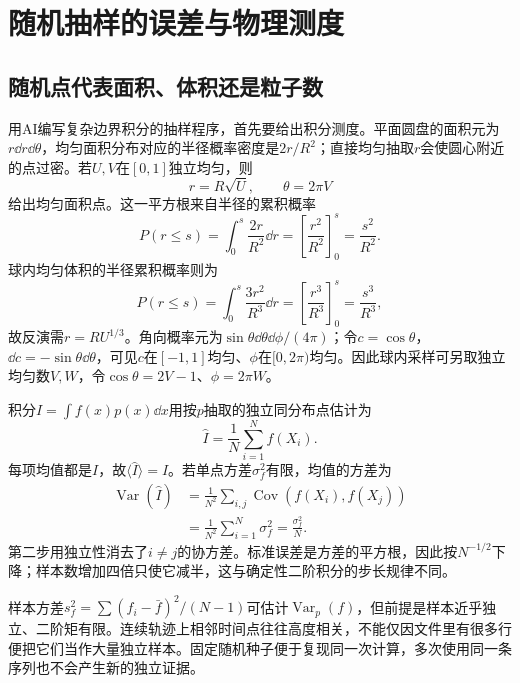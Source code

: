 \section{随机抽样的误差与物理测度}
\subsection{随机点代表面积、体积还是粒子数}
用AI编写复杂边界积分的抽样程序，首先要给出积分测度。平面圆盘的面积元为$r\dd r\dd\theta$，均匀面积分布对应的半径概率密度是$2r/R^2$；直接均匀抽取$r$会使圆心附近的点过密。若$U,V$在$[0,1]$独立均匀，则
\[
 r=R\sqrt U,\qquad\theta=2\pi V
\]
给出均匀面积点。这一平方根来自半径的累积概率
\[P(r\le s)=\int_0^s\frac{2r}{R^2}\dd r
=\left[\frac{r^2}{R^2}\right]_0^s=\frac{s^2}{R^2}.\]
球内均匀体积的半径累积概率则为
\[P(r\le s)=\int_0^s\frac{3r^2}{R^3}\dd r
=\left[\frac{r^3}{R^3}\right]_0^s=\frac{s^3}{R^3},\]
故反演需$r=RU^{1/3}$。角向概率元为$\sin\theta\dd\theta\dd\phi/(4\pi)$；令$c=\cos\theta$，$\dd c=-\sin\theta\dd\theta$，可见$c$在$[-1,1]$均匀、$\phi$在$[0,2\pi)$均匀。因此球内采样可另取独立均匀数$V,W$，令$\cos\theta=2V-1$、$\phi=2\pi W$。

积分$I=\int f(x)p(x)\dd x$用按$p$抽取的独立同分布点估计为
\[
\widehat I=\frac1N\sum_{i=1}^N f(X_i).
\]
每项均值都是$I$，故$\langle\widehat I\rangle=I$。若单点方差$\sigma_f^2$有限，均值的方差为
\[
\begin{aligned}
\operatorname{Var}(\widehat I)
&=\frac1{N^2}\sum_{i,j}\operatorname{Cov}(f(X_i),f(X_j))\\
&=\frac1{N^2}\sum_{i=1}^N\sigma_f^2
=\frac{\sigma_f^2}{N}.
\end{aligned}
\]
第二步用独立性消去了$i\ne j$的协方差。标准误差是方差的平方根，因此按$N^{-1/2}$下降；样本数增加四倍只使它减半，这与确定性二阶积分的步长规律不同。

样本方差$s_f^2=\sum(f_i-\bar f)^2/(N-1)$可估计$\operatorname{Var}_p(f)$，但前提是样本近乎独立、二阶矩有限。连续轨迹上相邻时间点往往高度相关，不能仅因文件里有很多行便把它们当作大量独立样本。固定随机种子便于复现同一次计算，多次使用同一条序列也不会产生新的独立证据。

